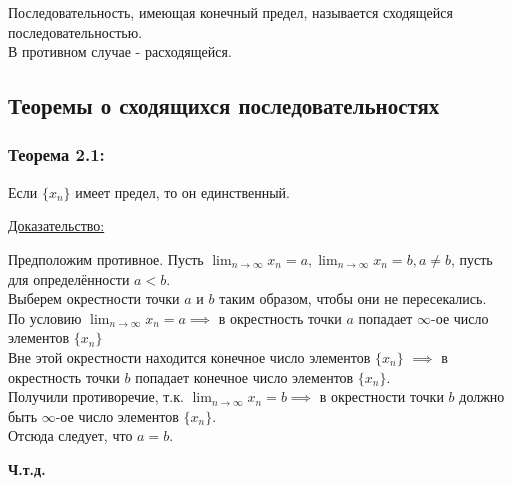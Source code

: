 \documentclass[12pt]{article}
\def\posl#1#2{\{#1_{#2}\}}
\begin{document}
    \noindent Последовательность, имеющая конечный предел, называется сходящейся последовательностью.\\В противном случае - расходящейся.

    \subsection{Теоремы о сходящихся последовательностях}
    \subsubsection*{Теорема 2.1:}
    Если $\posl{x}{n}$ имеет предел, то он единственный.\par\noindent
    \underline{Доказательство:}
    \begin{adjustwidth}{1.5em}{1.5em}
        Предположим противное. Пусть $\lim_{n\to\infty}x_n = a, \lim_{n\to\infty}x_n = b, a \ne b$, пусть для определённости $a < b$.\\
        Выберем окрестности точки $a$ и $b$ таким образом, чтобы они не пересекались.\\
        По условию $\lim_{n\to\infty} x_n = a \implies$ в окрестность точки $a$ попадает $\infty$-ое число элементов $\posl{x}{n}$\\
        Вне этой окрестности находится конечное число элементов $\posl{x}{n}$ $\implies$ в окрестность точки $b$ попадает конечное число элементов $\posl{x}{n}$.\\
        Получили противоречие, т.к. $\lim_{n\to\infty}x_n = b \implies$ в окрестности точки $b$ должно быть $\infty$-ое число элементов $\posl{x}{n}$.\\
        Отсюда следует, что $a = b$.
        \begin{center}
            \textbf{Ч.т.д.}
        \end{center}    
    \end{adjustwidth}
\end{document}
